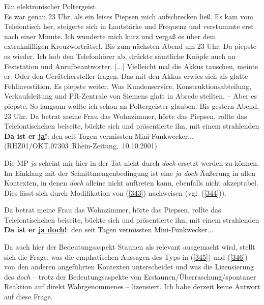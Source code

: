 \begin{exe}
	\ex\label{343} 
	\scriptsize
	Ein elektronischer Poltergeist\\
	Es war genau 23 Uhr, als ein leises Piepsen mich aufschrecken ließ. Es kam vom Telefontisch her, steigerte sich in Lautstärke und Frequenz und 				verstummte erst nach einer Minute. Ich wunderte mich kurz und vergaß es über dem extrakniffligen Kreuzworträtsel. Bis zum nächsten Abend um 23 Uhr. Da 	piepste es wieder. Ich hob den Telefonhörer ab, drückte sämtliche Knöpfe auch an Feststation und Anrufbeantworter. [...]
	Vielleicht mal die Akkus tauschen, meinte er. Oder den Gerätehersteller fragen. Das mit den Akkus erwies sich als glatte Fehlinvestition. Es piepste 		weiter. Was Kundenservice, Konstruktionsabteilung, Verkaufsleitung und PR-Zentrale von Siemens glatt in Abrede stellten. – Aber es piepste. So langsam 	wollte ich schon an Poltergeister glauben. Bis gestern Abend, 23 Uhr. Da betrat meine Frau das Wohnzimmer, hörte das Piepsen, rollte das 					Telefontischchen beiseite, bückte sich und präsentierte ihn, mit einem strahlenden \glqq \textbf{Da ist er \underline{ja}!}\grqq{}: den seit Tagen 			vermissten Mini-Funkwecker... 
	\hfill\hbox{(RHZ01/OKT.07303 Rhein-Zeitung, 10.10.2001)}	
\end{exe}					
Die MP \textit{ja} scheint mir hier in der Tat nicht durch \textit{doch} ersetzt werden zu können. Im Einklang mit der Schnittmengenbedingung ist eine \textit{ja doch}-Äußerung in allen Kontexten, in denen \textit{doch} alleine nicht auftreten kann, ebenfalls nicht akzeptabel. Dies lässt sich durch Modifikation von (\ref{343}) nachweisen (vgl. (\ref{344})).

\begin{exe}
	\ex\label{344} 
	\scriptsize
	Da betrat meine Frau das Wohnzimmer, hörte das Piepsen, rollte das Telefontischchen beiseite, bückte sich und präsentierte ihn, mit einem strahlenden  	\glqq *\textbf{Da ist er \underline{ja doch}!}\grqq{}: den seit Tagen vermissten Mini-Funkwecker... 
\end{exe}	
Da auch hier der Bedeutungsaspekt \glq Staunen\grq {} als relevant ausgemacht wird, stellt sich die Frage, was die emphatischen Aussagen des Typs in (\ref{345}) und (\ref{346}) von den anderen angeführten Kontexten unterscheidet und was die Lizensierung des \textit{doch} – trotz der Bedeutungsaspekte von Erstaunen/Überraschung/spontaner Reaktion auf direkt Wahrgenommenes – lizensiert. Ich habe derzeit keine Antwort auf diese Frage.

